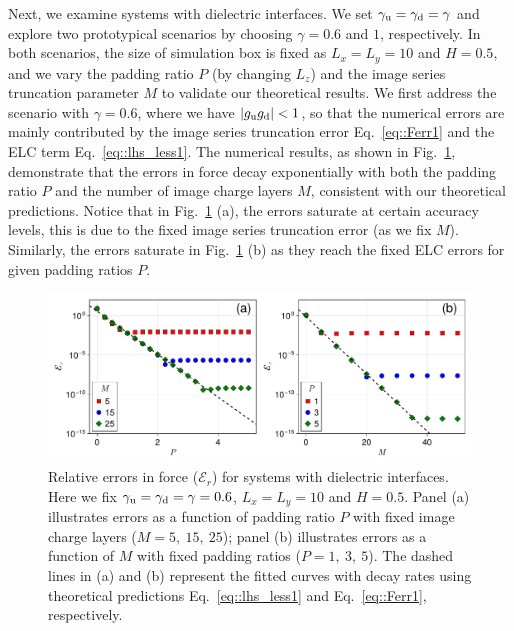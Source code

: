 Next, we examine systems with dielectric interfaces.
We set $\gamma_{\text{u}}=\gamma_{\text{d}}=\gamma$ and explore two prototypical scenarios by choosing $\gamma = 0.6$ and $1$, respectively. 
In both scenarios, the size of simulation box is fixed as $L_x=L_y=10$ and $H = 0.5$, and we vary the padding ratio $P$ (by changing $L_z$) and the image series truncation parameter $M$ to validate our theoretical results.
We first address the scenario with $\gamma = 0.6$, where we have $|g_{\text{u}}g_{\text{d}}| < 1$, so that the numerical errors are mainly contributed by the image series truncation error Eq.~\eqref{eq::Ferr1} and the ELC term Eq.~\eqref{eq::lhs_less1}.
The numerical results, as shown in Fig.~\ref{fig:error_icm_pad_gamma_0.6_force}, demonstrate that the errors in force decay exponentially with both the padding ratio $P$ and the number of image charge layers $M$, consistent with our theoretical predictions. Notice that in Fig.~\ref{fig:error_icm_pad_gamma_0.6_force} (a), the errors saturate at certain accuracy levels, this is due to the fixed image series truncation error (as we fix $M$). Similarly, the errors saturate in Fig.~\ref{fig:error_icm_pad_gamma_0.6_force} (b) as they reach the fixed ELC errors for given padding ratios $P$.
\begin{figure}[htbp]
    \centering
    \includegraphics[width=0.98\linewidth]{figs/error_icm_pad_gamma_0.6_force.pdf}
    \caption{Relative errors in force ($\mathcal{E}_r$) for systems with dielectric interfaces. Here we fix $\gamma_{\text{u}}=\gamma_{\text{d}}=\gamma = 0.6$, $L_x=L_y=10$ and $H = 0.5$. 
    Panel (a) illustrates errors as a function of padding ratio $P$ with fixed image charge layers ($M=5,~15,~25$); panel (b) illustrates errors as a function of $M$ with fixed padding ratios ($P = 1,~3,~5$). The dashed lines in (a) and (b) represent the fitted curves with decay rates using theoretical predictions Eq.~\eqref{eq::lhs_less1} and Eq.~\eqref{eq::Ferr1}, respectively.}
    \label{fig:error_icm_pad_gamma_0.6_force}
\end{figure}

